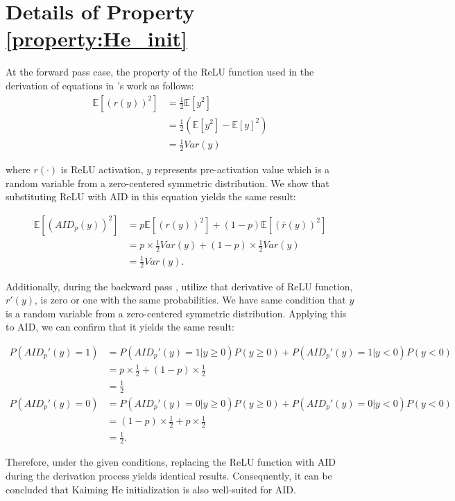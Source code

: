 

\section{Details of Property \ref{property:He_init}}
\label{app:He_init}

    At the forward pass case, the property of the ReLU function used in the derivation of equations in \citet{he2015delving}'s work as follows:
    \begin{align*}
        \mathbb E [(r(y))^2] &= \frac{1}{2} \mathbb E[y^2] \\
        &= \frac{1}{2} (\mathbb E[y^2]-\mathbb E[y]^2) \\
        &= \frac{1}{2} Var(y)
    \end{align*}

    where $r(\cdot)$ is ReLU activation, $y$ represents pre-activation value which is a random variable from a zero-centered symmetric distribution. We show that substituting ReLU with AID in this equation yields the same result:

    \begin{align*}
        \mathbb E [(AID_p(y))^2] &=  p\mathbb E[(r(y))^2] + (1-p) \mathbb E[(\bar r(y))^2]\\
        &= p\times \frac{1}{2}Var(y) + (1-p)\times \frac{1}{2}Var(y) \\
        &= \frac{1}{2}Var(y).
    \end{align*}

    Additionally, during the backward pass ,  \citet{he2015delving} utilize that derivative of ReLU function, $r'(y)$, is zero or one with the same probabilities. We have same condition that $y$ is a random variable from a zero-centered symmetric distribution.
    Applying this to AID, we can confirm that it yields the same result:

    \begin{align*}
        P(AID_p'(y) = 1) &= P(AID_p'(y) = 1 | y\geq0)P(y\geq0) + P(AID_p'(y) = 1 | y<0)P(y<0) \\
        &= p\times\frac{1}{2} + (1-p)\times\frac{1}{2} \\
        &= \frac{1}{2} \\
        P(AID_p'(y) = 0) &= P(AID_p'(y) = 0 | y\geq0)P(y\geq0) + P(AID_p'(y) = 0 | y<0)P(y<0) \\
        &= (1-p)\times\frac{1}{2} + p\times\frac{1}{2} \\
        &= \frac{1}{2}.
    \end{align*}

    Therefore, under the given conditions, replacing the ReLU function with AID during the derivation process yields identical results. Consequently, it can be concluded that Kaiming He initialization is also well-suited for AID.